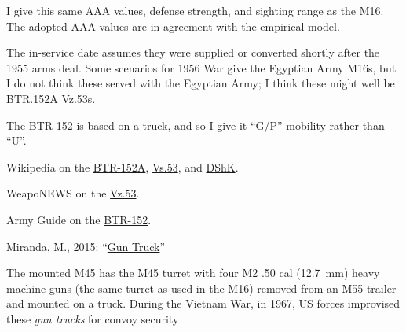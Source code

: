 \begin{withcounters}
{        

        

        I give this same AAA values, defense strength, and sighting range as the M16.
        The adopted AAA values are in agreement with the empirical model.

        The in-service date assumes they were supplied or converted shortly after the 1955 arms deal.
        Some {\EOTG} scenarios for 1956 War give the Egyptian Army M16s, but I do not think these served with the Egyptian Army; I think these might well be BTR.152A Vz.53s.

        The BTR-152 is based on a truck, and so I give it “G/P” mobility rather than “U”.

        \begin{notesources}
            \item Wikipedia on the \href{https://en.wikipedia.org/wiki/BTR-152\#Soviet_Union}{BTR-152A}, \href{https://en.wikipedia.org/wiki/Vz.53_anti-aircraft_gun}{Vs.53}, and \href{https://en.wikipedia.org/wiki/DShK}{DShK}.
            \item WeapoNEWS on the \href{https://weaponews.com/weapons/65350809-post-war-anti-aircraft-guns-of-czechoslovakia.html}{Vz.53}.
            \item Army Guide on the \href{https://www.army-guide.com/eng/product1120.html}{BTR-152}.
            \item Miranda, M., 2015: “\href{https://thesovietarmourblog.blogspot.com/2015/12/}{Gun Truck}”
        \end{notesources}
    }


    The mounted M45 has the M45 turret with four M2 .50 cal (12.7~mm) heavy machine guns (the same turret as used in the M16) removed from an M55 trailer and mounted on a truck.
    During the Vietnam War, in 1967, US forces improvised these \emph{gun trucks} for convoy security%
\end{withcounters}
